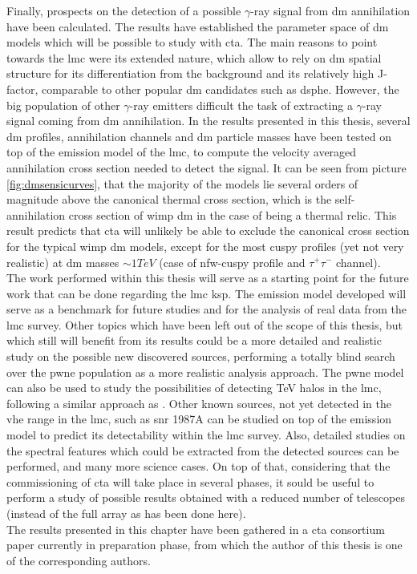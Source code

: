 \documentclass[main.tex]{subfiles}
\begin{document}
Finally, prospects on the detection of a possible $\gamma$-ray signal from \gls{dm} annihilation have been calculated. The results have established the parameter space of \gls{dm} models which will be possible to study with \gls{cta}. The main reasons to point towards the \gls{lmc} were its extended nature, which allow to rely on \gls{dm} spatial structure for its differentiation from the background and its relatively high J-factor, comparable to other popular \gls{dm} candidates such as \gls{dsphe}. However, the big population of other $\gamma$-ray emitters difficult the task of extracting a $\gamma$-ray signal coming from \gls{dm} annihilation. In the results presented in this thesis, several \gls{dm} profiles, annihilation channels and \gls{dm} particle masses have been tested on top of the emission model of the \gls{lmc}, to compute the velocity averaged annihilation cross section needed to detect the signal. It can be seen from picture \ref{fig:dmsensicurves}, that the majority of the models lie several orders of magnitude above the canonical thermal cross section, which is the self-annihilation cross section of \gls{wimp} \gls{dm} in the case of being a thermal relic. This result predicts that \gls{cta} will unlikely be able to exclude the canonical cross section for the typical \gls{wimp} \gls{dm} models, except for the most cuspy profiles (yet not very realistic) at \gls{dm} masses $\sim 1 TeV$ (case of nfw-cuspy profile and $\tau^+ \tau^-$ channel).\\
The work performed within this thesis will serve as a starting point for the future work that can be done regarding the \gls{lmc} \gls{ksp}. The emission model developed will serve as a benchmark for future studies and for the analysis of real data from the \gls{lmc} survey.
Other topics which have been left out of the scope of this thesis, but which still will benefit from its results could be a more detailed and realistic study on the possible new discovered sources, performing a totally blind search over the \gls{pwne} population as a more realistic analysis approach. The \gls{pwne} model can also be used to study the possibilities of detecting TeV halos in the \gls{lmc}, following a similar approach as \cite{2019tevhalos}. Other known sources, not yet detected in the \gls{vhe} range in the \gls{lmc}, such as \gls{snr} 1987A can be studied on top of the emission model to predict its detectability within the \gls{lmc} survey. Also, detailed studies on the spectral features which could be extracted from the detected sources can be performed, and many more science cases. On top of that, considering that the commissioning of \gls{cta} will take place in several phases, it sould be useful to perform a study of possible results obtained with a reduced number of telescopes (instead of the full array as has been done here).\\
The results presented in this chapter have been gathered in a \gls{cta} consortium paper currently in preparation phase, from which the author of this thesis is one of the corresponding authors.
\end{document}

